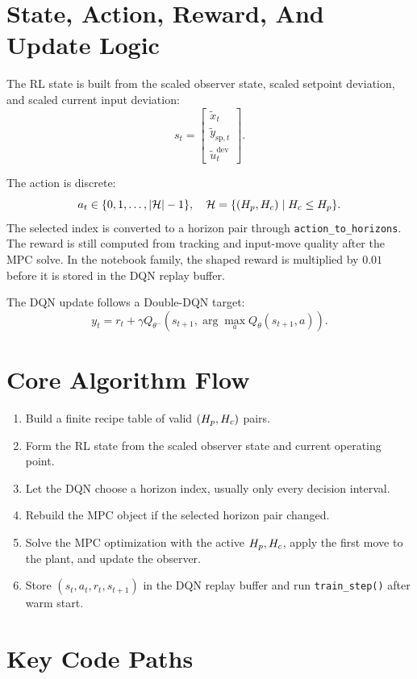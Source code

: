 \documentclass[11pt]{article}
\begin{document}
\section*{State, Action, Reward, And Update Logic}

The RL state is built from the scaled observer state, scaled setpoint deviation,
and scaled current input deviation:
\[
s_t =
\begin{bmatrix}
\tilde{x}_{t} \\
\tilde{y}_{\mathrm{sp},t} \\
\tilde{u}_{t}^{\mathrm{dev}}
\end{bmatrix}.
\]

The action is discrete:
\[
a_t \in \{0, 1, \dots, |\mathcal{H}| - 1\},
\quad
\mathcal{H} = \{(H_p,H_c) \mid H_c \le H_p\}.
\]
The selected index is converted to a horizon pair through
\texttt{action\_to\_horizons}. The reward is still computed from tracking and
input-move quality after the MPC solve. In the notebook family, the shaped
reward is multiplied by $0.01$ before it is stored in the DQN replay buffer.

The DQN update follows a Double-DQN target:
\[
y_t = r_t + \gamma
Q_{\theta^-}\left(s_{t+1},
\arg\max_a Q_{\theta}(s_{t+1}, a)\right).
\]

\section*{Core Algorithm Flow}

\begin{enumerate}
\item Build a finite recipe table of valid $(H_p,H_c)$ pairs.
\item Form the RL state from the scaled observer state and current operating
      point.
\item Let the DQN choose a horizon index, usually only every
      decision interval.
\item Rebuild the MPC object if the selected horizon pair changed.
\item Solve the MPC optimization with the active $H_p,H_c$, apply the first
      move to the plant, and update the observer.
\item Store $(s_t, a_t, r_t, s_{t+1})$ in the DQN replay buffer and run
      \texttt{train\_step()} after warm start.
\end{enumerate}

\section*{Key Code Paths}
\end{document}
